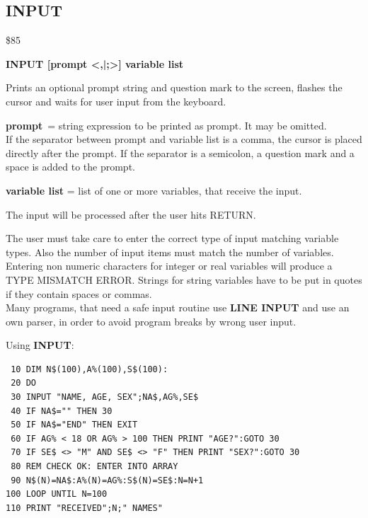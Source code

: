 \newpage
\subsection{INPUT}
\begin{description}[leftmargin=2cm,style=nextline]
\item [Token:] \$85
\item [Format:] {\bf INPUT [prompt <,|;>] variable list}
\item [Usage:] Prints an optional
               prompt string and question mark to the screen,
               flashes the cursor and waits for user input
               from the keyboard.

               {\bf prompt} = string expression to be printed
               as prompt. It may be omitted. \\
               If the separator between prompt and variable list
               is a comma, the cursor is placed directly after
               the prompt. If the separator is a semicolon,
               a question mark and a space is added to the prompt.

               {\bf variable list} = list of one or more
               variables, that receive the input.

               The input will be processed after the user hits RETURN.

\item [Remarks:] The user must take care to enter the correct
               type of input matching variable types.
               Also the number of input items must match the number
               of variables.
               Entering non numeric characters for integer or real
               variables will produce a TYPE MISMATCH ERROR.
               Strings for string variables have to be put in quotes
               if they contain spaces or commas. \\
               Many programs, that need a safe input routine use
               {\bf LINE INPUT} and use an own parser, in order
               to avoid program breaks by wrong user input.

\item [Example:] Using {\bf INPUT}:
\begin{tcolorbox}[colback=black,coltext=white]
\verbatimfont{\codefont}
\begin{verbatim}
 10 DIM N$(100),A%(100),S$(100):
 20 DO
 30 INPUT "NAME, AGE, SEX";NA$,AG%,SE$
 40 IF NA$="" THEN 30
 50 IF NA$="END" THEN EXIT
 60 IF AG% < 18 OR AG% > 100 THEN PRINT "AGE?":GOTO 30
 70 IF SE$ <> "M" AND SE$ <> "F" THEN PRINT "SEX?":GOTO 30
 80 REM CHECK OK: ENTER INTO ARRAY
 90 N$(N)=NA$:A%(N)=AG%:S$(N)=SE$:N=N+1
100 LOOP UNTIL N=100
110 PRINT "RECEIVED";N;" NAMES"
\end{verbatim}
\end{tcolorbox}
\end{description}

